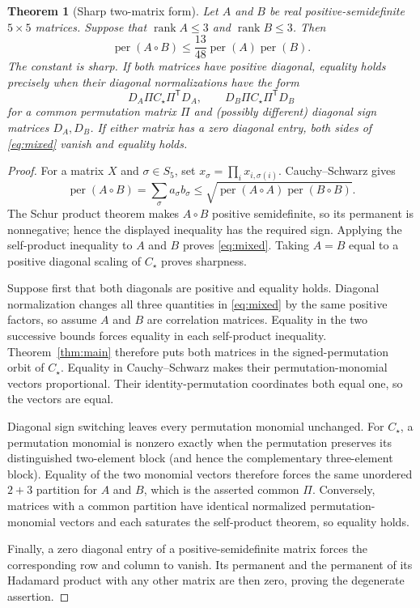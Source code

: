 \documentclass[11pt,a4paper]{article}
\newcommand{\per}{\operatorname{per}}
\newcommand{\rank}{\operatorname{rank}}
\newtheorem{theorem}{Theorem}
\theoremstyle{remark}\newtheorem{remark}[theorem]{Remark}
\begin{document}
\begin{theorem}[Sharp two-matrix form]\label{thm:mixed}
Let $A$ and $B$ be real positive-semidefinite $5\times5$ matrices. Suppose that
$\rank A\leq3$ and $\rank B\leq3$. Then
\begin{equation}\label{eq:mixed}
 \per(A\circ B)\leq\frac{13}{48}\per(A)\per(B).
\end{equation}
The constant is sharp. If both matrices have positive diagonal, equality holds precisely when their diagonal normalizations have the form
\[
 D_A\Pi C_\star\Pi^{\mathsf T}D_A,
 \qquad
 D_B\Pi C_\star\Pi^{\mathsf T}D_B
\]
for a common permutation matrix $\Pi$ and (possibly different) diagonal sign matrices $D_A,D_B$. If either matrix has a zero diagonal entry, both sides of \eqref{eq:mixed} vanish and equality holds.
\end{theorem}
\begin{proof}
For a matrix $X$ and $\sigma\in S_5$, set $x_\sigma=\prod_i x_{i,\sigma(i)}$. Cauchy--Schwarz gives
\[
 \per(A\circ B)=\sum_\sigma a_\sigma b_\sigma
 \leq\sqrt{\per(A\circ A)\per(B\circ B)}.
\]
The Schur product theorem makes $A\circ B$ positive semidefinite, so its permanent is nonnegative; hence the displayed inequality has the required sign. Applying the self-product inequality to $A$ and $B$ proves \eqref{eq:mixed}. Taking $A=B$ equal to a positive diagonal scaling of $C_\star$ proves sharpness.

Suppose first that both diagonals are positive and equality holds. Diagonal normalization changes all three quantities in \eqref{eq:mixed} by the same positive factors, so assume $A$ and $B$ are correlation matrices. Equality in the two successive bounds forces equality in each self-product inequality. Theorem~\ref{thm:main} therefore puts both matrices in the signed-permutation orbit of $C_\star$. Equality in Cauchy--Schwarz makes their permutation-monomial vectors proportional. Their identity-permutation coordinates both equal one, so the vectors are equal.

Diagonal sign switching leaves every permutation monomial unchanged. For $C_\star$, a permutation monomial is nonzero exactly when the permutation preserves its distinguished two-element block (and hence the complementary three-element block). Equality of the two monomial vectors therefore forces the same unordered $2+3$ partition for $A$ and $B$, which is the asserted common $\Pi$. Conversely, matrices with a common partition have identical normalized permutation-monomial vectors and each saturates the self-product theorem, so equality holds.

Finally, a zero diagonal entry of a positive-semidefinite matrix forces the corresponding row and column to vanish. Its permanent and the permanent of its Hadamard product with any other matrix are then zero, proving the degenerate assertion.
\end{proof}
\end{document}
